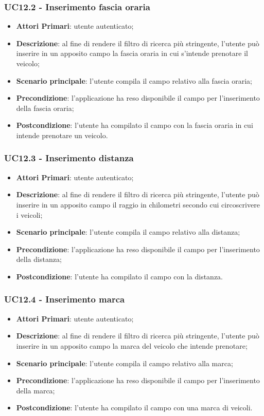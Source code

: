\subsubsection{UC12.2 - Inserimento fascia oraria}
\begin{itemize}
	\item \textbf{Attori Primari}: utente autenticato;
	\item \textbf{Descrizione}: al fine di rendere il filtro di ricerca più stringente, l'utente può inserire in un apposito campo la fascia oraria in cui s'intende prenotare il veicolo;
	\item \textbf{Scenario principale}: l'utente compila il campo relativo alla fascia oraria;	
	\item \textbf{Precondizione}: l'applicazione ha reso disponibile il campo per l'inserimento della fascia oraria;
	\item \textbf{Postcondizione}: l'utente ha compilato il campo con la fascia oraria in cui intende prenotare un veicolo.	
\end{itemize}

\subsubsection{UC12.3 - Inserimento distanza}
\begin{itemize}
	\item \textbf{Attori Primari}: utente autenticato;
	\item \textbf{Descrizione}: al fine di rendere il filtro di ricerca più stringente, l'utente può inserire in un apposito campo il raggio in chilometri secondo cui circoscrivere i veicoli;
	\item \textbf{Scenario principale}: l'utente compila il campo relativo alla distanza;	
	\item \textbf{Precondizione}: l'applicazione ha reso disponibile il campo per l'inserimento della distanza;
	\item \textbf{Postcondizione}: l'utente ha compilato il campo con la distanza.	
\end{itemize}

\subsubsection{UC12.4 - Inserimento marca}
\begin{itemize}
	\item \textbf{Attori Primari}: utente autenticato;
	\item \textbf{Descrizione}: al fine di rendere il filtro di ricerca più stringente, l'utente può inserire in un apposito campo la marca del veicolo che intende prenotare;
	\item \textbf{Scenario principale}: l'utente compila il campo relativo alla marca;	
	\item \textbf{Precondizione}: l'applicazione ha reso disponibile il campo per l'inserimento della marca;
	\item \textbf{Postcondizione}: l'utente ha compilato il campo con una marca di veicoli.	
\end{itemize}

